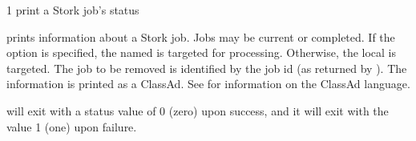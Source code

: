 \begin{ManPage}{\label{man-stork-status}}{1}
{print a Stork job's status}
\Synopsis {}
\ToolArgsBase

\Storkname
{}



\Description 

 prints information about a Stork job.  
Jobs may be current or completed.
If the  option is specified,
the named  is targeted for processing.
Otherwise, the local  is targeted.
The job to be removed is identified by the job id 
(as returned by ).
The information is printed as a ClassAd.
See  for information
on the ClassAd language.

\begin{Options}
	\ToolArgsBaseDesc
	\StorknameDesc
\end{Options}

\ExitStatus

 will exit with a status value of 0 (zero) upon success,
and it will exit with the value 1 (one) upon failure.

\end{ManPage}
